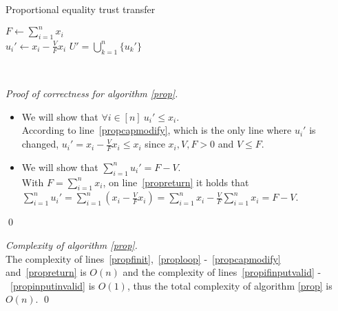 \documentclass[11pt]{llncs}
\begin{document}
    \begin{algorithm}[H]
       \label{prop}
       \caption{Proportional equality trust transfer}
       $F \gets \sum\limits_{i=1}^{n}x_i$ \label{propfinit} \\
          {$u_i' \gets x_i - \frac{V}{F} x_i$ \label{propcapmodify}}
       \Return $U' = \bigcup\limits_{k=1}^{n}\{u_k'\}$ \label{propreturn}
    \end{algorithm} \ \\
    \begin{proof}[Proof of correctness for algorithm \ref{prop}] \
       \begin{itemize}
          \item We will show that $\forall i \in [n] \: u_i' \leq x_i$. \\
          According to line~\ref{propcapmodify}, which is the only line where $u_i'$ is changed,
          $u_i' = x_i - \frac{V}{F}x_i \leq x_i$ since $x_i, V, F > 0$ and $V \leq F$.
          \item We will show that $\sum\limits_{i=1}^{n}u_i' = F - V$. \\
          With $F = \sum\limits_{i=1}^{n}x_i$, on line~\ref{propreturn} it holds that $\sum\limits_{i=1}^{n}u_i' =
          \sum\limits_{i=1}^{n}(x_i - \frac{V}{F}x_i) = \sum\limits_{i=1}^{n}x_i - \frac{V}{F}\sum\limits_{i=1}^{n}x_i =
          F - V$.
       \end{itemize}
       \qed
    \end{proof}
    \begin{proof}[Complexity of algorithm \ref{prop}] \ \\
       The complexity of lines~\ref{propfinit},~\ref{proploop} -~\ref{propcapmodify} and~\ref{propreturn} is $O(n)$ and the
       complexity of lines~\ref{propifinputvalid} -~\ref{propinputinvalid} is $O(1)$, thus the total complexity of algorithm
       \ref{prop} is $O(n)$. \qed
    \end{proof}
\end{document}
